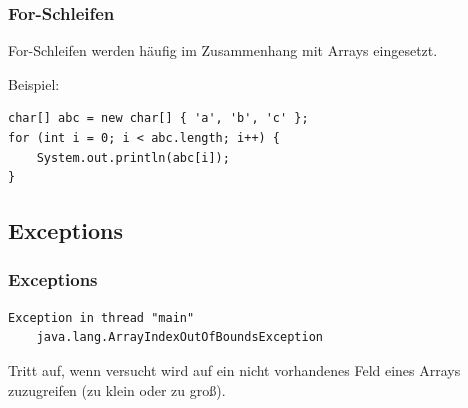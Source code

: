 \documentclass[final]{beamer}
\begin{document}
\begin{frame}[containsverbatim]
	\frametitle{For-Schleifen}
	For-Schleifen werden häufig im Zusammenhang mit Arrays eingesetzt.

	Beispiel:
	\begin{lstlisting}
char[] abc = new char[] { 'a', 'b', 'c' };
for (int i = 0; i < abc.length; i++) {
	System.out.println(abc[i]);
}
	\end{lstlisting}
\end{frame}

\subsection{Exceptions}
\begin{frame}[containsverbatim]
\frametitle{Exceptions}
\begin{lstlisting}
Exception in thread "main" 
	java.lang.ArrayIndexOutOfBoundsException
\end{lstlisting}
Tritt auf, wenn versucht wird auf ein nicht vorhandenes Feld eines Arrays zuzugreifen
(zu klein oder zu groß).

\end{frame}
\end{document}
